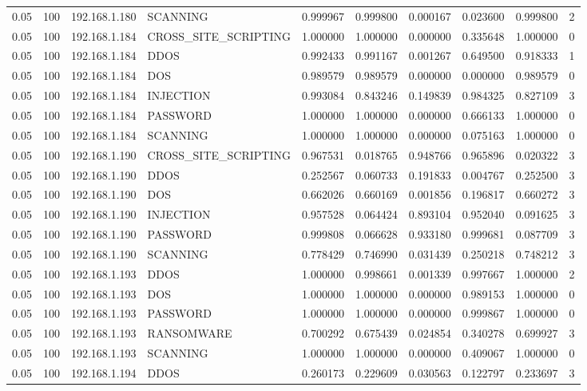 \begin{tabular}{llllllllll}
0.05 & 100 & 192.168.1.180 & SCANNING & 0.999967 & 0.999800 & 0.000167 & 0.023600 & 0.999800 & 2 \\
0.05 & 100 & 192.168.1.184 & CROSS\_SITE\_SCRIPTING & 1.000000 & 1.000000 & 0.000000 & 0.335648 & 1.000000 & 0 \\
0.05 & 100 & 192.168.1.184 & DDOS & 0.992433 & 0.991167 & 0.001267 & 0.649500 & 0.918333 & 1 \\
0.05 & 100 & 192.168.1.184 & DOS & 0.989579 & 0.989579 & 0.000000 & 0.000000 & 0.989579 & 0 \\
0.05 & 100 & 192.168.1.184 & INJECTION & 0.993084 & 0.843246 & 0.149839 & 0.984325 & 0.827109 & 3 \\
0.05 & 100 & 192.168.1.184 & PASSWORD & 1.000000 & 1.000000 & 0.000000 & 0.666133 & 1.000000 & 0 \\
0.05 & 100 & 192.168.1.184 & SCANNING & 1.000000 & 1.000000 & 0.000000 & 0.075163 & 1.000000 & 0 \\
0.05 & 100 & 192.168.1.190 & CROSS\_SITE\_SCRIPTING & 0.967531 & 0.018765 & 0.948766 & 0.965896 & 0.020322 & 3 \\
0.05 & 100 & 192.168.1.190 & DDOS & 0.252567 & 0.060733 & 0.191833 & 0.004767 & 0.252500 & 3 \\
0.05 & 100 & 192.168.1.190 & DOS & 0.662026 & 0.660169 & 0.001856 & 0.196817 & 0.660272 & 3 \\
0.05 & 100 & 192.168.1.190 & INJECTION & 0.957528 & 0.064424 & 0.893104 & 0.952040 & 0.091625 & 3 \\
0.05 & 100 & 192.168.1.190 & PASSWORD & 0.999808 & 0.066628 & 0.933180 & 0.999681 & 0.087709 & 3 \\
0.05 & 100 & 192.168.1.190 & SCANNING & 0.778429 & 0.746990 & 0.031439 & 0.250218 & 0.748212 & 3 \\
0.05 & 100 & 192.168.1.193 & DDOS & 1.000000 & 0.998661 & 0.001339 & 0.997667 & 1.000000 & 2 \\
0.05 & 100 & 192.168.1.193 & DOS & 1.000000 & 1.000000 & 0.000000 & 0.989153 & 1.000000 & 0 \\
0.05 & 100 & 192.168.1.193 & PASSWORD & 1.000000 & 1.000000 & 0.000000 & 0.999867 & 1.000000 & 0 \\
0.05 & 100 & 192.168.1.193 & RANSOMWARE & 0.700292 & 0.675439 & 0.024854 & 0.340278 & 0.699927 & 3 \\
0.05 & 100 & 192.168.1.193 & SCANNING & 1.000000 & 1.000000 & 0.000000 & 0.409067 & 1.000000 & 0 \\
0.05 & 100 & 192.168.1.194 & DDOS & 0.260173 & 0.229609 & 0.030563 & 0.122797 & 0.233697 & 3 \\

\end{tabular}
